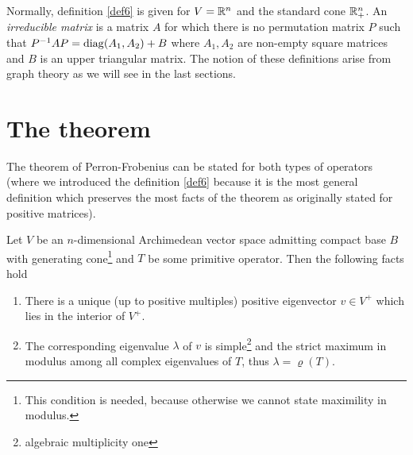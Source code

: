 \documentclass{article}
\begin{document}
\begin{remark}\label{rem4}
Normally, definition \ref{def6} is given for $V=\mathbb{R}^n$ and the standard cone $\mathbb{R}^n_+$.
An \emph{irreducible matrix} is a matrix $A$ for which there is no permutation matrix $P$ such that $P^{-1}AP=\operatorname{diag}(A_1,A_2)+B$ where $A_1,A_2$ are non-empty square matrices and $B$ is an upper triangular matrix. The notion of these definitions arise from graph theory as we will see in the last sections.
\end{remark}

\section{The theorem}

The theorem of Perron-Frobenius can be stated for both types of operators (where we introduced the definition \ref{def6} because it is the most general definition which preserves the most facts of the theorem as originally stated for positive matrices).

\begin{theorem}\label{theo1}
Let $V$ be an $n$-dimensional Archimedean vector space admitting compact base $B$ with generating cone\footnote{This condition is needed, because otherwise we cannot state maximility in modulus.}  and $T$ be some primitive operator. Then the following facts hold
\begin{enumerate}
\item There is a unique (up to positive multiples) positive eigenvector $v\in V^+$ which lies in the interior of $V^+$.
\item The corresponding eigenvalue $\lambda$ of $v$ is simple\footnote{algebraic multiplicity one} and the strict maximum in modulus among all complex eigenvalues of $T$, thus $\lambda=\varrho(T)$.
\end{enumerate}
\end{theorem}
\end{document}
